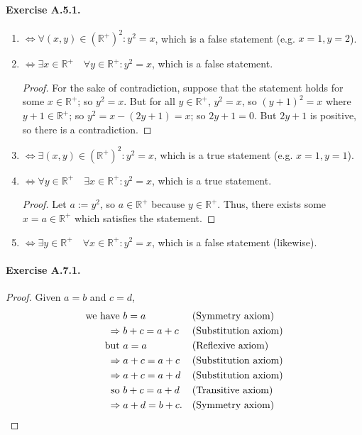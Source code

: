 \paragraph{Exercise A.5.1.}
\begin{enumerate}
    \item $\Leftrightarrow \forall (x,y) \in (\mathbb{R}^+)^2  : y^2=x$, which is a false statement (e.g. $x=1,y=2$). 
    \item $\Leftrightarrow \exists x \in \mathbb{R}^+ \quad \forall y \in \mathbb{R}^+ : y^2=x$, which is a false statement. \begin{proof}
        For the sake of contradiction, suppose that the statement holds for some $x \in \mathbb{R}^+$; so $y^2=x$. But for all $y \in \mathbb{R}^+$, $y^2=x$, so $(y+1)^2=x$ where $y+1 \in \mathbb{R}^+$; so $y^2=x-(2y+1)=x$; so $2y+1=0$. But $2y+1$ is positive, so there is a contradiction.
    \end{proof}
    \item $\Leftrightarrow \exists (x,y) \in (\mathbb{R}^+)^2  : y^2=x$, which is a true statement (e.g. $x=1,y=1$). 
    \item $\Leftrightarrow \forall y \in \mathbb{R}^+ \quad \exists x \in \mathbb{R}^+ : y^2=x$, which is a true statement. \begin{proof}
        Let $a := {y}^2$, so $a\in \mathbb{R}^+$ because $y \in \mathbb{R}^+$. Thus, there exists some $x=a\in \mathbb{R}^+$ which satisfies the statement.
    \end{proof}
    \item $\Leftrightarrow \exists y \in \mathbb{R}^+ \quad \forall x \in \mathbb{R}^+ : y^2=x$, which is a false statement (likewise).
\end{enumerate}

\paragraph{Exercise A.7.1.}
\begin{proof}
    Given $a=b$ and $c = d$,
    \begin{align*}
        \text{we have } {} &b=a && \text{(Symmetry axiom)}\\
        \Rightarrow {} &b+c=a+c && \text{(Substitution axiom)}\\
        \text{but } {} &a=a && \text{(Reflexive axiom)}\\
        \Rightarrow {} &a+c=a+c && \text{(Substitution axiom)}\\
        \Rightarrow {} &a+c=a+d && \text{(Substitution axiom)}\\
        \text{so } {} &b+c=a+d && \text{(Transitive axiom)}\\
        \Rightarrow {} &a+d=b+c. && \text{(Symmetry axiom)} \qedhere
    \end{align*}
\end{proof}